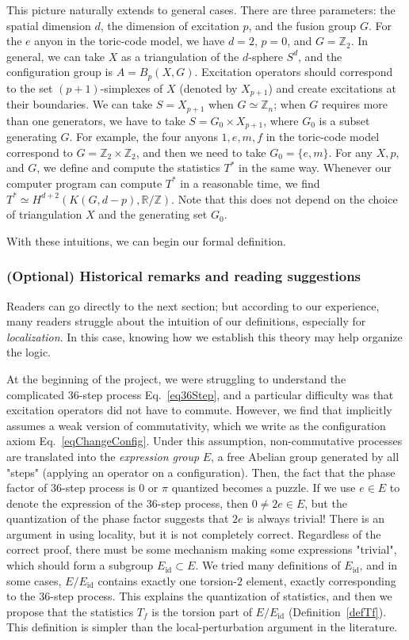 \documentclass[reprint, amsmath, amssymb, showpacs, floatfix, longbibliography, aps, twocolumn, superscriptaddress, nofootinbib]{revtex4-2}
\newcommand{\ZZ}{{\mathbb Z}}
\newcommand{\RR}{{\mathbb R}}
\newcommand{\id}{{\operatorname{id}}}
\theoremstyle{definition}
\begin{document}
This picture naturally extends to general cases. There are three parameters: the spatial dimension $d$, the dimension of excitation $p$, and the fusion group $G$. For the $e$ anyon in the toric-code model, we have $d=2$, $p=0$, and $G=\ZZ_2$. In general, we can take $X$ as a triangulation of the $d$-sphere $S^d$, and the configuration group is $A=B_p(X,G)$. Excitation operators should correspond to the set $(p+1)$-simplexes of $X$ (denoted by $X_{p+1}$) and create excitations at their boundaries. We can take $S=X_{p+1}$ when $G\simeq \ZZ_n$; when $G$ requires more than one generators, we have to take $S=G_0\times X_{p+1}$, where $G_0$ is a subset generating $G$. For example, the four anyons $1,e,m,f$ in the toric-code model correspond to $G=\ZZ_2\times \ZZ_2$, and then we need to take $G_0=\{e,m\}$. For any $X,p$, and $G$, we define and compute the statistics $T^*$ in the same way. Whenever our computer program can compute $T^*$ in a reasonable time, we find $T^*\simeq H^{d+2}(K(G,d-p),\RR/\ZZ)$. Note that this does not depend on the choice of triangulation $X$ and the generating set $G_0$.

With these intuitions, we can begin our formal definition.


\subsubsection*{(Optional) Historical remarks and reading suggestions}

Readers can go directly to the next section; but according to our experience, many readers struggle about the intuition of our definitions, especially for \textit{localization}. In this case, knowing how we establish this theory may help organize the logic. 

At the beginning of the project, we were struggling to understand the complicated $36$-step process Eq.~\eqref{eq36Step}, and a particular difficulty was that excitation operators did not have to commute. However, we find that \cite{FHH21} implicitly assumes a weak version of commutativity, which we write as the configuration axiom Eq.~\eqref{eqChangeConfig}. Under this assumption, non-commutative processes are translated into the  \textit{expression group} $E$, a free Abelian group generated by all "steps" (applying an operator on a configuration). Then, the fact that the phase factor of $36$-step process is $0$ or $\pi$ quantized becomes a puzzle. If we use $e\in E$ to denote the expression of the $36$-step process, then $0\ne 2e\in E$, but the quantization of the phase factor suggests that $2e$ is always trivial! There is an argument in \cite{FHH21} using locality, but it is not completely correct. Regardless of the correct proof, there must be some mechanism making some expressions "trivial", which should form a subgroup $E_{\operatorname{id}}\subset E$. We tried many definitions of $E_\id$, and in some cases, $E/E_\id$ contains exactly one torsion-$2$ element, exactly corresponding to the $36$-step process. This explains the quantization of statistics, and then we propose that the statistics $T_f$ is the torsion part of $E/E_\id$ (Definition~\ref{defTf}). This definition is simpler than the local-perturbation argument in the literature. 
\end{document}
